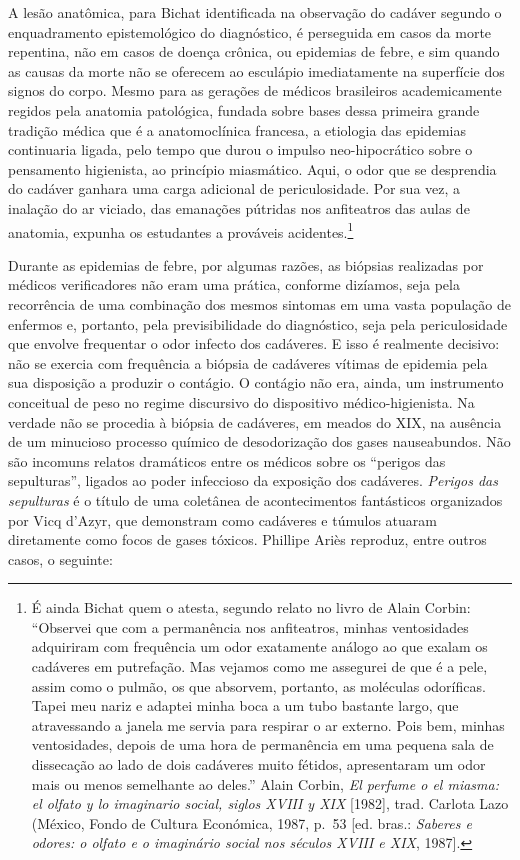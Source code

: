 A lesão anatômica, para Bichat identificada na observação do cadáver
segundo o enquadramento epistemológico do diagnóstico, é perseguida em
casos da morte repentina, não em casos de doença crônica, ou epidemias
de febre, e sim quando as causas da morte não se oferecem ao esculápio
imediatamente na superfície dos signos do corpo. Mesmo para as gerações
de médicos brasileiros academicamente regidos pela anatomia patológica,
fundada sobre bases dessa primeira grande tradição médica que é a
anatomoclínica francesa, a etiologia das epidemias continuaria ligada,
pelo tempo que durou o impulso neo-hipocrático sobre o pensamento
higienista, ao princípio miasmático. Aqui, o odor que se desprendia do
cadáver ganhara uma carga adicional de periculosidade. Por sua vez, a
inalação do ar viciado, das emanações pútridas nos anfiteatros das aulas
de anatomia, expunha os estudantes a prováveis acidentes.\footnote{É
  ainda Bichat quem o atesta, segundo relato no livro de Alain Corbin:
  ``Observei que com a permanência nos anfiteatros, minhas ventosidades
  adquiriram com frequência um odor exatamente análogo ao que exalam os
  cadáveres em putrefação. Mas vejamos como me assegurei de que é a
  pele, assim como o pulmão, os que absorvem, portanto, as moléculas
  odoríficas. Tapei meu nariz e adaptei minha boca a um tubo bastante
  largo, que atravessando a janela me servia para respirar o ar externo.
  Pois bem, minhas ventosidades, depois de uma hora de permanência em
  uma pequena sala de dissecação ao lado de dois cadáveres muito
  fétidos, apresentaram um odor mais ou menos semelhante ao deles.''
  Alain Corbin, \emph{El perfume o el miasma: el olfato y lo imaginario
  social, siglos XVIII y XIX} {[}1982{]}, trad. Carlota Lazo (México,
  Fondo de Cultura Económica, 1987, p.~53 {[}ed. bras.: \emph{Saberes e
  odores: o olfato e o imaginário social nos séculos XVIII e XIX},
  1987{]}.}

Durante as epidemias de febre, por algumas razões, as biópsias
realizadas por médicos verificadores não eram uma prática, conforme
dizíamos, seja pela recorrência de uma combinação dos mesmos sintomas em
uma vasta população de enfermos e, portanto, pela previsibilidade do
diagnóstico, seja pela periculosidade que envolve frequentar o odor
infecto dos cadáveres. E isso é realmente decisivo: não se exercia com
frequência a biópsia de cadáveres vítimas de epidemia pela sua
disposição a produzir o contágio. O contágio não era, ainda, um
instrumento conceitual de peso no regime discursivo do dispositivo
médico-higienista. Na verdade não se procedia à biópsia de cadáveres, em
meados do XIX, na ausência de um minucioso processo químico de
desodorização dos gases nauseabundos. Não são incomuns relatos
dramáticos entre os médicos sobre os ``perigos das sepulturas'', ligados
ao poder infeccioso da exposição dos cadáveres. \emph{Perigos das
sepulturas} é o título de uma coletânea de acontecimentos fantásticos
organizados por Vicq d'Azyr, que demonstram como cadáveres e túmulos
atuaram diretamente como focos de gases tóxicos. Phillipe Ariès
reproduz, entre outros casos, o seguinte:

